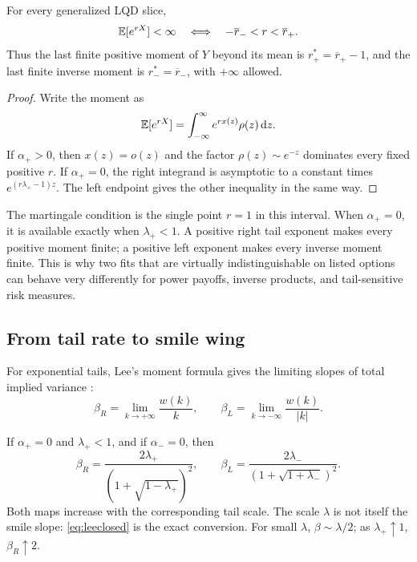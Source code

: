 \begin{proposition}
\label{prop:strip}
For every generalized LQD slice,
\begin{equation}
\mathbb{E}[e^{rX}]<\infty
\quad\Longleftrightarrow\quad
-\overline r_-<r<\overline r_+.
\label{eq:strip}
\end{equation}
Thus the last finite positive moment of $Y$ beyond its mean is
$r_+^*=\overline r_+-1$, and the last finite inverse moment is
$r_-^*=\overline r_-$, with $+\infty$ allowed.
\end{proposition}

\begin{proof}
Write the moment as
\[
\mathbb{E}[e^{rX}]=\int_{-\infty}^{\infty}e^{rx(z)}\rho(z)\,\mathrm{d} z.
\]
If $\alpha_+>0$, then $x(z)=o(z)$ and the factor $\rho(z)\sim e^{-z}$
dominates every fixed positive $r$.  If $\alpha_+=0$, the right integrand is
asymptotic to a constant times $e^{(r\lambda_+-1)z}$.  The left endpoint
gives the other inequality in the same way.
\end{proof}

The martingale condition is the single point $r=1$ in this interval.  When
$\alpha_+=0$, it is available exactly when $\lambda_+<1$.  A positive right
tail exponent makes every positive moment finite; a positive left exponent
makes every inverse moment finite.  This is why two fits that are virtually
indistinguishable on listed options can behave very differently for power
payoffs, inverse products, and tail-sensitive risk measures.

\subsection{From tail rate to smile wing}

For exponential tails, Lee's moment formula gives the limiting slopes of
total implied variance \citep{Lee2004}:
\begin{equation}
\beta_R=\lim_{k\to+\infty}\frac{w(k)}k,
\qquad
\beta_L=\lim_{k\to-\infty}\frac{w(k)}{|k|}.
\label{eq:lee}
\end{equation}

\begin{proposition}
\label{prop:leeclosed}
If $\alpha_+=0$ and $\lambda_+<1$, and if $\alpha_-=0$, then
\begin{equation}
\beta_R=\frac{2\lambda_+}{(1+\sqrt{1-\lambda_+})^2},
\qquad
\beta_L=\frac{2\lambda_-}{(1+\sqrt{1+\lambda_-})^2}.
\label{eq:leeclosed}
\end{equation}
Both maps increase with the corresponding tail scale.  The scale $\lambda$
is not itself the smile slope: \eqref{eq:leeclosed} is the exact conversion.
For small $\lambda$, $\beta\sim\lambda/2$; as $\lambda_+\uparrow1$,
$\beta_R\uparrow2$.
\end{proposition}

